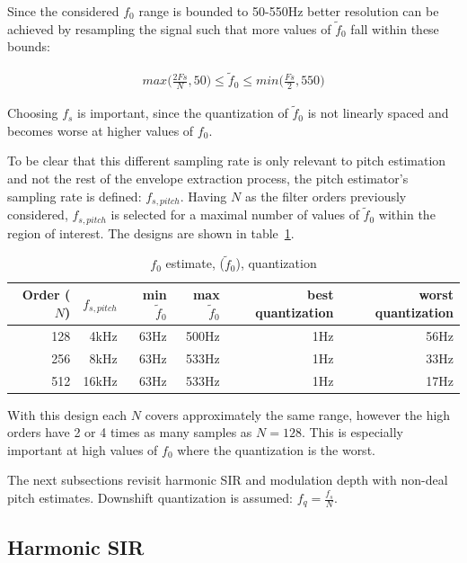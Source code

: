 \documentclass [11pt, proquest,oneside] {ganter_thesis}[2015/03/03]
\begin{document}
Since the considered $f_0$ range is bounded to 50-550Hz better resolution can be achieved by resampling the signal such that more values of $\tilde{f}_0$ fall within these bounds:

\begin{align}
max\Big(\frac{2Fs}{N}, 50\Big) \leq \tilde{f}_0 \leq min\Big(\frac{Fs}{2}, 550\Big)
\end{align}

Choosing $f_s$ is important, since the quantization of $\tilde{f}_0$ is not linearly spaced and becomes worse at higher values of $f_0$.

To be clear that this different sampling rate is only relevant to pitch estimation and not the rest of the envelope extraction process, the pitch estimator's sampling rate is defined: $f_{s,pitch}$.  Having $N$ as the filter orders previously considered, $f_{s,pitch}$ is selected for a maximal number of values of $\tilde{f}_0$ within the region of interest.  The designs are shown in table~\ref{table:f0_quantization}.

\begin{table}
\begin{center}
\begin{tabular}{| r | r | r | r | r | r |}
  \hline
  \textbf{Order ($N$)} & \textbf{$f_{s,pitch}$} &  \textbf{min $\tilde{f}_0$} & \textbf{max $\tilde{f}_0$} &  \textbf{best quantization} &  \textbf{worst quantization} \\ \hline
  128 & 4kHz & 63Hz & 500Hz & 1Hz & 56Hz \\ \hline
  256 & 8kHz & 63Hz & 533Hz & 1Hz & 33Hz \\ \hline
  512 & 16kHz & 63Hz & 533Hz & 1Hz & 17Hz \\ \hline
\end{tabular}
\end{center}
\caption{$f_0$ estimate, ($\tilde{f}_0$), quantization}\label{table:f0_quantization}
\end{table}

With this design each $N$ covers approximately the same range, however the high orders have 2 or 4 times as many samples as $N = 128$.  This is especially important at high values of $f_0$ where the quantization is the worst.

The next subsections revisit harmonic SIR and modulation depth with non-deal pitch estimates.  Downshift quantization is assumed: $f_q = \frac{f_s}{N}$.

\subsection{Harmonic SIR}
\end{document}
